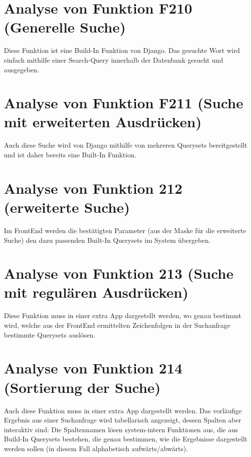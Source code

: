\section{Analyse von Funktion F210 (Generelle Suche)}
Diese Funktion ist eine Build-In Funktion von Django. Das gesuchte Wort wird einfach mithilfe einer Search-Query innerhalb der Datenbank gesucht und ausgegeben. 

\section{Analyse von Funktion F211 (Suche mit erweiterten Ausdrücken)}
Auch diese Suche wird von Django mithilfe von mehreren Querysets bereitgestellt und ist daher bereits eine Built-In Funktion.

\section{Analyse von Funktion 212 (erweiterte Suche)}
Im FrontEnd werden die bestätigten Parameter (aus der Maske für die erweiterte Suche) den dazu passenden Built-In Querysets im System übergeben. 

\section{Analyse von Funktion 213 (Suche mit regulären Ausdrücken)}
Diese Funktion muss in einer extra App dargestellt werden, wo genau bestimmt wird, welche aus der FrontEnd ermittelten Zeichenfolgen in der Suchanfrage bestimmte Querysets auslösen.

\section{Analyse von Funktion 214 (Sortierung der Suche)}
Auch diese Funktion muss in einer extra App dargestellt werden. Das vorläufige Ergebnis aus einer Suchanfrage wird tabellarisch angezeigt, dessen Spalten aber interaktiv sind: Die Spaltennamen lösen system-intern Funktionen aus, die aus Build-In Querysets bestehen, die genau bestimmen, wie die Ergebnisse dargestellt werden sollen (in diesem Fall alphabetisch aufwärts/abwärts). 



 